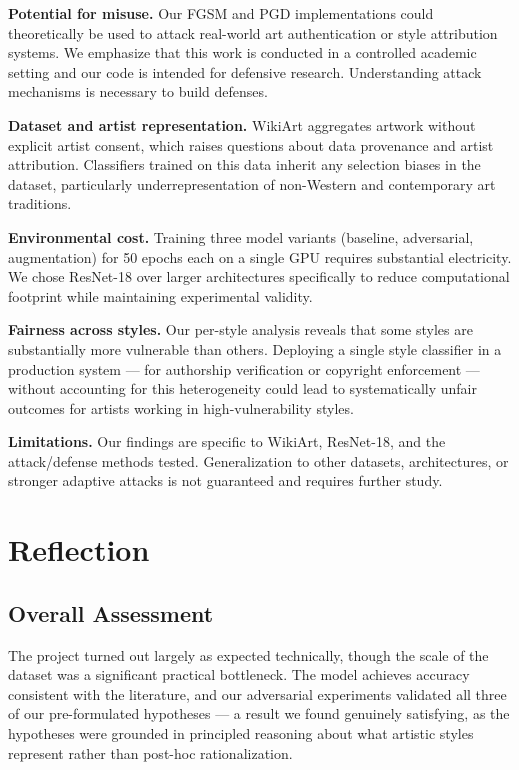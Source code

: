 \documentclass[conference]{IEEEtran}
\begin{document}
\textbf{Potential for misuse.} Our FGSM and PGD implementations could theoretically be used to attack real-world art authentication or style attribution systems. We emphasize that this work is conducted in a controlled academic setting and our code is intended for defensive research. Understanding attack mechanisms is necessary to build defenses.

\textbf{Dataset and artist representation.} WikiArt aggregates artwork without explicit artist consent, which raises questions about data provenance and artist attribution. Classifiers trained on this data inherit any selection biases in the dataset, particularly underrepresentation of non-Western and contemporary art traditions.

\textbf{Environmental cost.} Training three model variants (baseline, adversarial, augmentation) for 50 epochs each on a single GPU requires substantial electricity. We chose ResNet-18 over larger architectures specifically to reduce computational footprint while maintaining experimental validity.

\textbf{Fairness across styles.} Our per-style analysis reveals that some styles are substantially more vulnerable than others. Deploying a single style classifier in a production system — for authorship verification or copyright enforcement — without accounting for this heterogeneity could lead to systematically unfair outcomes for artists working in high-vulnerability styles.

\textbf{Limitations.} Our findings are specific to WikiArt, ResNet-18, and the attack/defense methods tested. Generalization to other datasets, architectures, or stronger adaptive attacks is not guaranteed and requires further study.

\section{Reflection}

\subsection{Overall Assessment}

The project turned out largely as expected technically, though the scale of the dataset was a significant practical bottleneck. The model achieves accuracy consistent with the literature, and our adversarial experiments validated all three of our pre-formulated hypotheses — a result we found genuinely satisfying, as the hypotheses were grounded in principled reasoning about what artistic styles represent rather than post-hoc rationalization.
\end{document}
